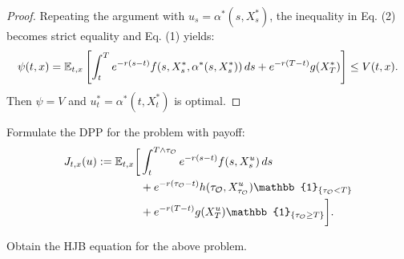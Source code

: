\begin{remark}
\begin{proof}
        Repeating the argument with $u_s = \alpha^*(s, X_s^*)$, the inequality in Eq. (2) becomes strict equality and Eq. (1) yields:
        \[ \psi(t,x) = \mathbb E_{t,x} \left[ \int_t^T e^{-r(s-t)} f(s, X_s^*, \alpha^*(s, X_s^*)) \, ds + e^{-r(T-t)} g(X_T^*) \right] \leq V(t,x). \]
        Then $\psi = V$ and $u_t^* = \alpha^*(t, X_t^*)$ is optimal.
    \end{proof}
\end{remark}

\begin{homework}
    Formulate the DPP for the problem with payoff:
    \begin{align*}
        J_{t,x}(u) := \EE_{t,x} \bigg[ &\int_t^{T \wedge \tau_{\mc{O}}} e^{-r(s-t)} f(s, X_s^u) \, ds \\
        &+ e^{-r(\tau_{\mc{O}}-t)} h(\tau_{\mc{O}}, X_{\tau_{\mc{O}}}^u) \mathbb{1}_{\{\tau_{\mc{O}} < T\}} \\
        &+ e^{-r(T-t)} g(X_T^u) \mathbb{1}_{\{\tau_{\mc{O}} \geq T\}} \bigg].
    \end{align*}
\end{homework}

\begin{homework}
    Obtain the HJB equation for the above problem.
\end{homework}